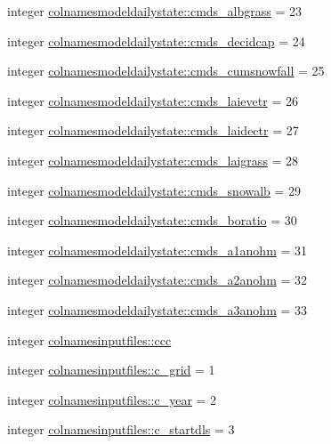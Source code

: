 \begin{DoxyCompactItemize}
\item 
integer \hyperlink{namespacecolnamesmodeldailystate_a53c82f7ef580a1b1a4310bab3f415d51}{colnamesmodeldailystate\+::cmds\+\_\+albgrass} = 23
\item 
integer \hyperlink{namespacecolnamesmodeldailystate_a7be9d6e61475f041e0d57ec9e05d689a}{colnamesmodeldailystate\+::cmds\+\_\+decidcap} = 24
\item 
integer \hyperlink{namespacecolnamesmodeldailystate_ac757dc9bd818fb0023473fdb2a740424}{colnamesmodeldailystate\+::cmds\+\_\+cumsnowfall} = 25
\item 
integer \hyperlink{namespacecolnamesmodeldailystate_aca4aea86be7b7a39ac147f1de44ef31d}{colnamesmodeldailystate\+::cmds\+\_\+laievetr} = 26
\item 
integer \hyperlink{namespacecolnamesmodeldailystate_a9fcf1fdba9e943f4f175afa5fe21e775}{colnamesmodeldailystate\+::cmds\+\_\+laidectr} = 27
\item 
integer \hyperlink{namespacecolnamesmodeldailystate_a304310c2408ada88dda0f8ced7fc92eb}{colnamesmodeldailystate\+::cmds\+\_\+laigrass} = 28
\item 
integer \hyperlink{namespacecolnamesmodeldailystate_ae49ae7c1f8b6c90134157a353a0a346d}{colnamesmodeldailystate\+::cmds\+\_\+snowalb} = 29
\item 
integer \hyperlink{namespacecolnamesmodeldailystate_abdab4968466e793575f276e13794bc31}{colnamesmodeldailystate\+::cmds\+\_\+boratio} = 30
\item 
integer \hyperlink{namespacecolnamesmodeldailystate_af1ef06d721d861a48a69d2e6188d9466}{colnamesmodeldailystate\+::cmds\+\_\+a1anohm} = 31
\item 
integer \hyperlink{namespacecolnamesmodeldailystate_a4450888ab830733b52d6b0d2c8832223}{colnamesmodeldailystate\+::cmds\+\_\+a2anohm} = 32
\item 
integer \hyperlink{namespacecolnamesmodeldailystate_a3d5abb7056671ea99f913a8956ceef91}{colnamesmodeldailystate\+::cmds\+\_\+a3anohm} = 33
\item 
integer \hyperlink{namespacecolnamesinputfiles_adb0ede73a6346d7e8fd56b1f1e3d1fc4}{colnamesinputfiles\+::ccc}
\item 
integer \hyperlink{namespacecolnamesinputfiles_a334c7aef52fe2d0196e09b041ef19c9a}{colnamesinputfiles\+::c\+\_\+grid} = 1
\item 
integer \hyperlink{namespacecolnamesinputfiles_a5d453725b0ca2cbc00c9b7a5026d8e2b}{colnamesinputfiles\+::c\+\_\+year} = 2
\item 
integer \hyperlink{namespacecolnamesinputfiles_a654ffd5c6d266efea6259fbea77c8ef1}{colnamesinputfiles\+::c\+\_\+startdls} = 3

\end{DoxyCompactItemize}
